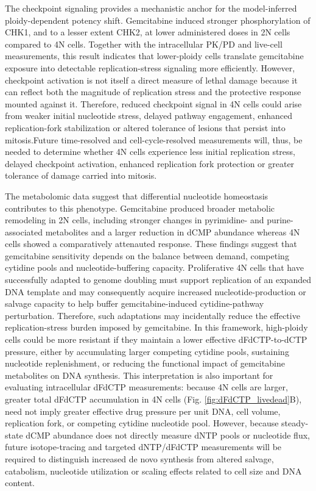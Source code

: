 \documentclass[11pt,notitlepage]{article}
\begin{document}
The checkpoint signaling provides a mechanistic anchor for the model-inferred ploidy-dependent potency shift. Gemcitabine induced stronger phosphorylation of CHK1, and to a lesser extent CHK2, at lower administered doses in 2N cells compared to 4N cells. Together with the intracellular PK/PD and live-cell measurements, this result indicates that lower-ploidy cells translate gemcitabine exposure into detectable replication-stress signaling more efficiently. However, checkpoint activation is not itself a direct measure of lethal damage because it can reflect both the magnitude of replication stress and the protective response mounted against it. Therefore, reduced checkpoint signal in 4N cells could arise from weaker initial nucleotide stress, delayed pathway engagement, enhanced replication-fork stabilization or altered tolerance of lesions that persist into mitosis.Future time-resolved and cell-cycle-resolved measurements will, thus, be needed to determine whether 4N cells experience less initial replication stress, delayed checkpoint activation, enhanced replication fork protection or greater tolerance of damage carried into mitosis.

The metabolomic data suggest that differential nucleotide homeostasis contributes to this phenotype. Gemcitabine produced broader metabolic remodeling in 2N cells, including stronger changes in pyrimidine- and purine-associated metabolites and a larger reduction in dCMP abundance whereas 4N cells showed a comparatively attenauted response. These findings suggest that gemcitabine sensitivity depends on the balance between demand, competing cytidine pools and nucleotide-buffering capacity. Proliferative 4N cells that have successfully adapted to genome doubling must support replication of an expanded DNA template and may consequently acquire increased nucleotide-production or salvage capacity to help buffer gemcitabine-induced cytidine-pathway perturbation. Therefore, such adaptations may incidentally reduce the effective replication-stress burden imposed by gemcitabine. In this framework, high-ploidy cells could be more resistant if they maintain a lower effective dFdCTP-to-dCTP pressure, either by accumulating larger competing cytidine pools, sustaining nucleotide replenishment, or reducing the functional impact of gemcitabine metabolites on DNA synthesis. This interpretation is also important for evaluating intracellular dFdCTP measurements: because 4N cells are larger, greater total dFdCTP accumulation in 4N cells (Fig. \ref{fig:dFdCTP_livedead}B), need not imply greater effective drug pressure per unit DNA, cell volume, replication fork, or competing cytidine nucleotide pool. However, because steady-state dCMP abundance does not directly measure dNTP pools or nucleotide flux, future isotope-tracing and targeted dNTP/dFdCTP measurements will be required to distinguish increased de novo synthesis from altered salvage, catabolism, nucleotide utilization or scaling effects related to cell size and DNA content.
\end{document}
